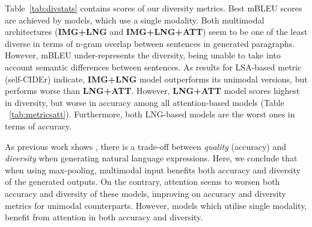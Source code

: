 \documentclass[11pt,a4paper]{article}
\begin{document}
Table~\ref{tab:divstats} contains scores of our diversity metrics.
Best mBLEU scores are achieved by models, which use a single modality.
Both multimodal architectures (\textbf{IMG+LNG} and \textbf{IMG+LNG+ATT}) seem to be one of the least diverse in terms of n-gram overlap between sentences in generated paragraphs.
However, mBLEU under-represents the diversity, being unable to take into account semantic differences between sentences.
As results for LSA-based metric (self-CIDEr) indicate, \textbf{IMG+LNG} model outperforms its unimodal versions, but performs worse than \textbf{LNG+ATT}.
However, \textbf{LNG+ATT} model scores highest in diversity, but worse in accuracy among all attention-based models (Table ~\ref{tab:metricsatt}).
Furthermore, both LNG-based models are the worst ones in terms of accuracy.

As previous work shows \cite{Caccia2018,Holtzman2019}, there is a trade-off between \textit{quality} (accuracy) and \textit{diversity} when generating natural language expressions.
Here, we conclude that when using max-pooling, multimodal input benefits both accuracy and diversity of the generated outputs.
On the contrary, attention seems to worsen both accuracy and diversity of these models, improving on accuracy and diversity metrics for unimodal counterparts.
However, models which utilise single modality, benefit from attention in both accuracy and diversity.



\end{document}
